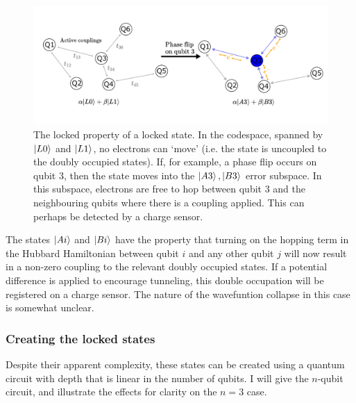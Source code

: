 \documentclass{report}
\begin{document}
\begin{appendices}
\begin{figure}[ht]
    \centering
    \includegraphics[scale = 0.8]{Figures/locked_states.pdf}
    \caption{The locked property of a locked state. In the codespace, spanned by $\ket{L0}$ and $\ket{L1}$, no electrons can `move' (i.e. the state is uncoupled to the doubly occupied states). If, for example, a phase flip occurs on qubit 3, then the state moves into the $\ket{A3}, \ket{B3}$ error subspace. In this subspace, electrons are free to hop between qubit 3 and the neighbouring qubits where there is a coupling applied. This can perhaps be detected by a charge sensor.
    }\label{fig:lockedstates}
\end{figure}

The states $\ket{Ai}$ and $\ket{Bi}$ have the property that turning on the hopping term in the Hubbard Hamiltonian between qubit $i$ and any other qubit $j$ will now result in a non-zero coupling to the relevant doubly occupied states. If a potential difference is applied to encourage tunneling, this double occupation will be registered on a charge sensor. The nature of the wavefuntion collapse in this case is somewhat unclear.
\subsubsection{Creating the locked states}
Despite their apparent complexity, these states can be created using a quantum circuit with depth that is linear in the number of qubits. I will give the $n$-qubit circuit, and illustrate the effects for clarity on the $n = 3$ case.


\end{appendices}
\end{document}
